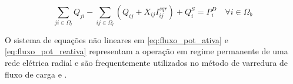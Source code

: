 \begin{equation}
    \sum_{ji\in\Omega_{l}}Q_{ji} - \sum_{ij\in\Omega_{l}}(Q_{ij} + X_{ij}I_{ij}^{sqr}) + Q_{i}^{S} = P_{i}^{D}\quad\forall i \in\Omega_{b}\label{eq:fluxo_pot_reativa}
\end{equation}

O sistema de equações não lineares em \eqref{eq:fluxo_pot_ativa} e \eqref{eq:fluxo_pot_reativa} representam a operação em regime permanente de uma rede elétrica radial e são frequentemente utilizados no método de varredura de fluxo de carga \cite{Shirmohammadi1988ANetworks} e \cite{Cespedes1990NewNetworks}.